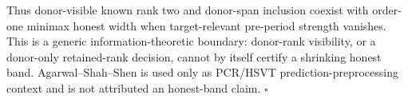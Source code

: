 Thus donor-visible known rank two and donor-span inclusion coexist with order-one minimax honest width when target-relevant pre-period strength vanishes.  This is a generic information-theoretic boundary: donor-rank visibility, or a donor-only retained-rank decision, cannot by itself certify a shrinking honest band.  Agarwal--Shah--Shen is used only as PCR/HSVT prediction-preprocessing context and is not attributed an honest-band claim. \(\square\)
